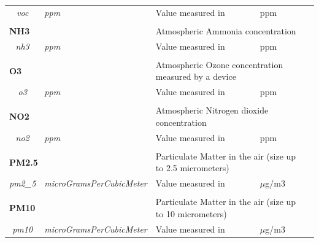 \begin{landscape}
\begin{longtable}{cllll}
   \textit{voc}                          & \textit{ppm}                       & Value measured in                                      & ppm                            &  \\ [0.4em] \cline{1-4}
   \\[-0.85em]
   \multicolumn{2}{l}{\textbf{NH3}}                                           & \multicolumn{2}{l}{Atmospheric Ammonia concentration}                                   &  \\
   \textit{nh3}                          & \textit{ppm}                       & Value measured in                                      & ppm                            &  \\ [0.4em] \cline{1-4}
   \\[-0.85em]
   \multicolumn{2}{l}{\textbf{O3}}                                            & \multicolumn{2}{l}{Atmospheric Ozone concentration measured by a device}                &  \\
   \textit{o3}                           & \textit{ppm}                       & Value measured in                                      & ppm                            &  \\ [0.4em] \cline{1-4}
   \\[-0.85em]
   \multicolumn{2}{l}{\textbf{NO2}}                                           & \multicolumn{2}{l}{Atmospheric Nitrogen dioxide concentration}                          &  \\
   \textit{no2}                          & \textit{ppm}                       & Value measured in                                      & ppm                            &  \\ [0.4em] \cline{1-4}
   \\[-0.85em]
   \multicolumn{2}{l}{\textbf{PM2.5}}                                         & \multicolumn{2}{l}{Particulate Matter in the air (size up to 2.5 micrometers)}          &  \\
   \textit{pm2\_5}                       & \textit{microGramsPerCubicMeter}   & Value measured in                                      & $\mu$g/m3                      &  \\ [0.4em] \cline{1-4}
   \\[-0.85em]
   \multicolumn{2}{l}{\textbf{PM10}}                                          & \multicolumn{2}{l}{Particulate Matter in the air (size up to 10 micrometers)}           &  \\
   \textit{pm10}                         & \textit{microGramsPerCubicMeter}   & Value measured in                                      & $\mu$g/m3                      &  \\ [0.4em] \cline{1-4}

\end{longtable}
\end{landscape}
